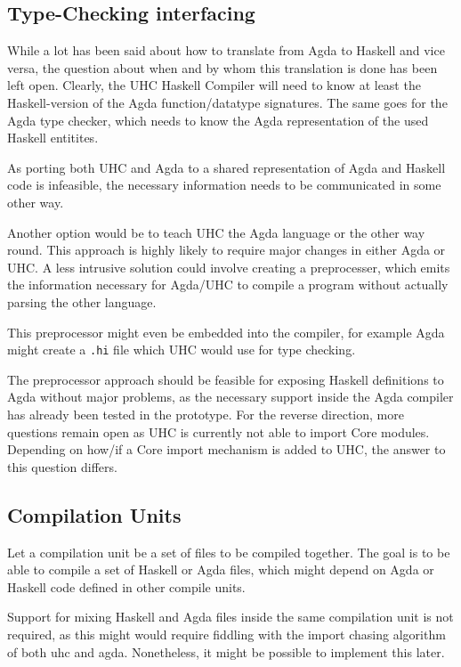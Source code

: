 \documentclass[12pt, a4paper, twoside]{report}
\begin{document}
\subsection{Type-Checking interfacing}


While a lot has been said about how to translate from Agda to Haskell and vice versa,
the question about when and by whom this translation is done has been left open. Clearly,
the UHC Haskell Compiler will need to know at least the Haskell-version of the Agda
function/datatype signatures. The same goes for the Agda type checker, which needs to
know the Agda representation of the used Haskell entitites.

As porting both UHC and Agda to a shared representation of Agda and Haskell code
is infeasible, the necessary information needs to be communicated in some other way.


Another option would be to teach UHC the Agda language or the other way round. This approach
is highly likely to require major changes in either Agda or UHC.
A less intrusive solution could involve creating a preprocesser, which emits the
information necessary for Agda/UHC to compile a program without actually parsing
the other language. 

This preprocessor might even be embedded into the compiler, for example Agda might create
a \texttt{.hi} file which UHC would use for type checking.

The preprocessor approach should be feasible for exposing Haskell definitions to Agda
without major problems, as the necessary support inside the Agda compiler has already
been tested in the prototype.
For the reverse direction, more questions remain open as UHC is currently not able
to import Core modules. Depending on how/if a Core import mechanism is added to UHC,
the answer to this question differs.


\subsection{Compilation Units}
Let a compilation unit be a set of files to be compiled together. The goal is to be able to compile a set of
Haskell or Agda files, which might depend on Agda or Haskell code defined in other compile units.

Support for mixing Haskell and Agda files inside the same compilation unit is not required, as this
might would require fiddling with the import chasing algorithm of both uhc and agda. Nonetheless,
it might be possible to implement this later.
\end{document}
